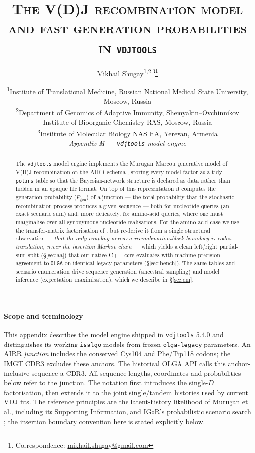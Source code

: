 \documentclass[11pt]{article}
\title{\scshape The V(D)J recombination model and fast generation probabilities in \texttt{vdjtools}}
\author{Mikhail Shugay\textsuperscript{1,2,3}\thanks{Correspondence:
  \href{mailto:mikhail.shugay@gmail.com}{mikhail.shugay@gmail.com}}}
\date{%
  \small
  \textsuperscript{1}Institute of Translational Medicine, Russian National Medical State University, Moscow, Russia\\
  \textsuperscript{2}Department of Genomics of Adaptive Immunity, Shemyakin--Ovchinnikov Institute of Bioorganic Chemistry RAS, Moscow, Russia\\
  \textsuperscript{3}Institute of Molecular Biology NAS RA, Yerevan, Armenia\\[6pt]
  \normalsize\textit{Appendix M --- \texttt{vdjtools} model engine}%
}
\theoremstyle{oldplain}
\theoremstyle{oldrem}
\newcommand{\Pgen}{P_{\mathrm{gen}}}
\begin{document}
\maketitle

\begin{abstract}
\noindent
The \texttt{vdjtools} model engine implements the Murugan--Marcou generative model of V(D)J
recombination \cite{Murugan2012,Marcou2018} on the AIRR schema \cite{VanderHeiden2018}, storing every
model factor as a tidy \texttt{polars} table so that the Bayesian-network structure is declared as data
rather than hidden in an opaque file format. On top of this representation it computes the generation
probability ($\Pgen$) of a junction --- the total probability that the stochastic recombination process
produces a given sequence --- both for nucleotide queries (an exact scenario sum) and, more delicately,
for amino-acid queries, where one must marginalise over all synonymous nucleotide realisations. For the
amino-acid case we use the transfer-matrix factorisation of \cite{Sethna2019}, but re-derive
it from a single structural observation --- \emph{that the only coupling across a recombination-block
boundary is codon translation, never the insertion Markov chain} --- which yields a clean left/right
partial-sum split (\S\ref{sec:aa}) that our native C++ core evaluates with machine-precision agreement to \texttt{OLGA} on identical legacy parameters
(\S\ref{sec:bench}). The same tables and scenario enumeration
drive sequence generation (ancestral sampling) and model inference (expectation--maximisation), which we
describe in \S\ref{sec:em}.
\end{abstract}

\paragraph{Scope and terminology} This appendix describes the model engine shipped in
\texttt{vdjtools} 5.4.0 and distinguishes its working \texttt{isalgo} models from frozen
\texttt{olga-legacy} parameters.
An AIRR \emph{junction} includes the conserved Cys104 and Phe/Trp118 codons;
the IMGT CDR3 excludes these anchors.
The historical OLGA API calls this anchor-inclusive sequence a CDR3.
All sequence lengths, coordinates and probabilities below refer to the junction.
The notation first introduces the single-$D$ factorisation, then extends it to the
joint single/tandem histories used by current VDJ fits.
The reference principles are the latent-history likelihood of Murugan et al.,
including its Supporting Information, and IGoR's probabilistic scenario search
\cite{Murugan2012,Marcou2018}; the insertion boundary convention here is stated explicitly below.
\end{document}

